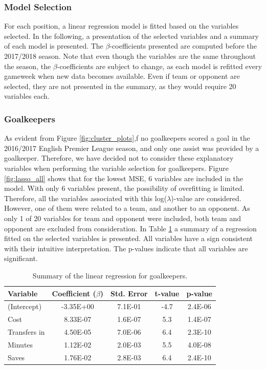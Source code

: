 \subsubsection{Model Selection}
For each position, a linear regression model is fitted based on the variables selected. In the following, a presentation of the selected variables and a summary of each model is presented. The $\beta$-coefficients presented are computed before the 2017/2018 season. Note that even though the variables are the same throughout the season, the $\beta$-coefficients are subject to change, as each model is refitted every gameweek when new data becomes available. Even if team or opponent are selected, they are not presented in the summary, as they would require 20 variables each.

\newpar

\subsubsection{Goalkeepers}

As evident from Figure \ref{fig:cluster_plots},f no goalkeepers scored a goal in the 2016/2017 English Premier League season, and only one assist was provided by a goalkeeper. Therefore, we have decided not to consider these explanatory variables when performing the variable selection for goalkeepers. Figure \ref{fig:lasso_all} shows that for the lowest MSE, 6 variables are included in the model. With only 6 variables present, the possibility of overfitting is limited. Therefore, all the variables associated with this log($\lambda$)-value are considered. However, one of them were related to a team, and another to an opponent. As only 1 of 20 variables for team and opponent were included, both team and opponent are excluded from consideration. In Table \ref{tab:coef_GLK} a summary of a regression fitted on the selected variables is presented. All variables have a sign consistent with their intuitive interpretation. The p-values indicate that all variables are significant. 

\begin{table}[H]
\centering
\begin{tabular}{|l|c|c|c|c|}
\hline
Variable     & Coefficient ($\beta$) & Std. Error & t-value & p-value \\ \hline
(Intercept)  & -3.35E+00    & 7.1E-01    & -4.7    & 2.4E-06               \\
Cost         & 8.33E-07 & 1.6E-07    & 5.3     & 1.4E-07               \\
Transfers in & 4.50E-05 & 7.0E-06    & 6.4     & 2.3E-10               \\
Minutes      & 1.12E-02 & 2.0E-03    & 5.5     & 4.0E-08               \\
Saves        & 1.76E-02 & 2.8E-03    & 6.4     & 2.4E-10
\\
\hline
\end{tabular}
\caption{Summary of the linear regression for goalkeepers.}
\label{tab:coef_GLK}
\end{table}

